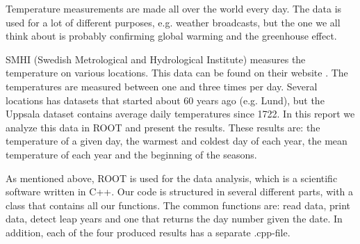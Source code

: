 

Temperature measurements are made all over the world every day. The data is used for a lot of different purposes, e.g. weather broadcasts, but the one we all think about is probably confirming global warming and the greenhouse effect. 

SMHI (Swedish Metrological and Hydrological Institute) measures the temperature on various locations. This data can be found on their website \cite{smhidata}. The temperatures are measured between one and three times per day. Several locations has datasets that started about 60 years ago (e.g. Lund), but the Uppsala dataset contains average daily temperatures since 1722. In this report we analyze this data in ROOT and present the results. These results are: the temperature of a given day, the warmest and coldest day of each year, the mean temperature of each year and the beginning of the seasons. 

As mentioned above, ROOT is used for the data analysis, which is a scientific software written in C++. Our code is structured in several different parts, with a class that contains all our functions. The common functions are: read data, print data, detect leap years and one that returns the day number given the date. In addition, each of the four produced results has a separate .cpp-file. 


